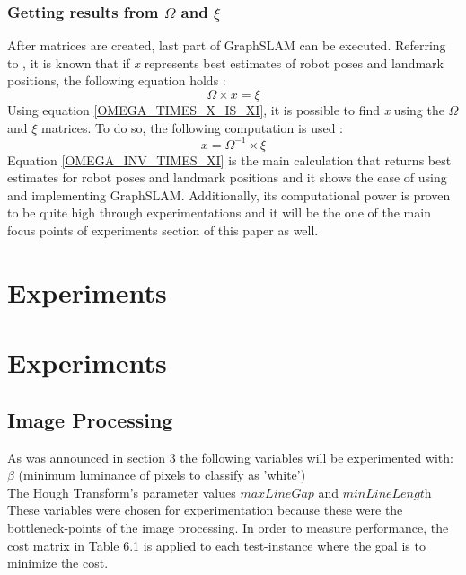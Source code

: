 \documentclass{ba-kecs}
\numberwithin{figure}{section}
\numberwithin{equation}{section}
\begin{document}
\subsubsection{Getting results from $\Omega$ and $\xi$}
	After matrices are created, last part of GraphSLAM can be executed. Referring to \cite{sik2}, it is known that if \textit{x} represents best estimates of robot poses and landmark positions, the following equation holds :
	\begin{equation}
	\Omega \times x = \xi \label{OMEGA_TIMES_X_IS_XI}
	\end{equation}
	Using equation \eqref{OMEGA_TIMES_X_IS_XI}, it is possible to find \textit{x} using the $\Omega$ and $\xi$ matrices. To do so, the following computation is used :
	\begin{equation}
	x = \Omega^{-1} \times \xi \label{OMEGA_INV_TIMES_XI}
	\end{equation}
	Equation \eqref{OMEGA_INV_TIMES_XI} is the main calculation that returns best estimates for robot poses and landmark positions and it shows the ease of using and implementing GraphSLAM. Additionally, its computational power is proven to be quite high through experimentations\cite{sik,sik2} and it will be the one of the main focus points of experiments section of this paper as well.



\section{Experiments}

\section{Experiments}

\subsection{Image Processing}
As was announced in section 3 the following variables will be experimented with: \\
$\beta$ (minimum luminance of pixels to classify as 'white')\\
The Hough Transform's parameter values $\textit{maxLineGap}$ and $\textit{minLineLength}$ \\
These variables were chosen for experimentation because these were the bottleneck-points of the image processing. 
In order to measure performance, the cost matrix in Table 6.1 is applied to each test-instance where the goal is to minimize the cost. \\
\end{document}
